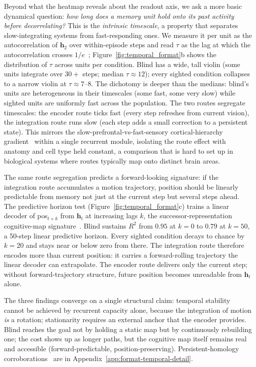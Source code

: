 \documentclass{article}
\begin{document}
\noindent Beyond what the heatmap reveals about the readout axis, we ask a more basic dynamical question: \emph{how long does a memory unit hold onto its past activity before decorrelating?} This is the \emph{intrinsic timescale}, a property that separates slow-integrating systems from fast-responding ones. We measure it per unit as the autocorrelation of $\mathbf{h}_2$ over within-episode steps and read $\tau$ as the lag at which the autocorrelation crosses $1/e$~\citep{murray2014timescales}; Figure~\ref{fig:temporal_format}b shows the distribution of $\tau$ across units per condition. Blind has a wide, tall violin (some units integrate over $30+$ steps; median $\tau \approx 12$); every sighted condition collapses to a narrow violin at $\tau \approx 7$--$8$. The dichotomy is deeper than the medians: blind's units are heterogeneous in their timescales (some fast, some very slow) while sighted units are uniformly fast across the population. The two routes segregate timescales: the encoder route ticks fast (every step refreshes from current vision), the integration route runs slow (each step adds a small correction to a persistent state). This mirrors the slow-prefrontal-vs-fast-sensory cortical-hierarchy gradient~\citep{murray2014timescales} within a single recurrent module, isolating the route effect with anatomy and cell type held constant, a comparison that is hard to set up in biological systems where routes typically map onto distinct brain areas.

\noindent The same route segregation predicts a forward-looking signature: if the integration route accumulates a motion trajectory, position should be linearly predictable from memory not just at the current step but several steps ahead. The predictive horizon test (Figure~\ref{fig:temporal_format}c) trains a linear decoder of pos$_{t+k}$ from $\mathbf{h}_t$ at increasing lags $k$, the successor-representation cognitive-map signature~\citep{stachenfeld2017predictive}. Blind sustains $R^2$ from $0.95$ at $k{=}0$ to $0.79$ at $k{=}50$, a 50-step linear predictive horizon. Every sighted condition decays to chance by $k{=}20$ and stays near or below zero from there. The integration route therefore encodes more than current position: it carries a forward-rolling trajectory the linear decoder can extrapolate. The encoder route delivers only the current step; without forward-trajectory structure, future position becomes unreadable from $\mathbf{h}_t$ alone.

\noindent The three findings converge on a single structural claim: temporal stability cannot be achieved by recurrent capacity alone, because the integration of motion \emph{is} a rotation; stationarity requires an external anchor that the encoder provides. Blind reaches the goal not by holding a static map but by continuously rebuilding one; the cost shows up as longer paths, but the cognitive map itself remains real and accessible (forward-predictable, position-preserving). Persistent-homology corroborations~\citep{gardner2022toroidal} are in Appendix~\ref{app:format-temporal-detail}.
\end{document}
